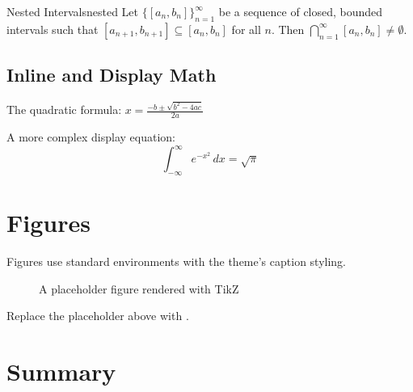 \documentclass[11pt, a4paper]{scrartcl}
\begin{document}
\begin{lemma}{Nested Intervals}{nested}
  Let $\{[a_n, b_n]\}_{n=1}^{\infty}$ be a sequence of closed, bounded intervals such that
  $[a_{n+1}, b_{n+1}] \subseteq [a_n, b_n]$ for all $n$. Then
  $\bigcap_{n=1}^{\infty} [a_n, b_n] \neq \emptyset$.
\end{lemma}

\subsection{Inline and Display Math}

The quadratic formula: $x = \frac{-b \pm \sqrt{b^2 - 4ac}}{2a}$

A more complex display equation:
\[
  \int_{-\infty}^{\infty} e^{-x^2} \, dx = \sqrt{\pi}
\]


\section{Figures}

Figures use standard  environments with the theme's caption styling.

\begin{figure}[H]
  \centering
  \caption{A placeholder figure rendered with TikZ}
  \label{fig:placeholder}
\end{figure}

\begin{tipblock}
Replace the placeholder above with .
\end{tipblock}


\section{Summary}
\end{document}
